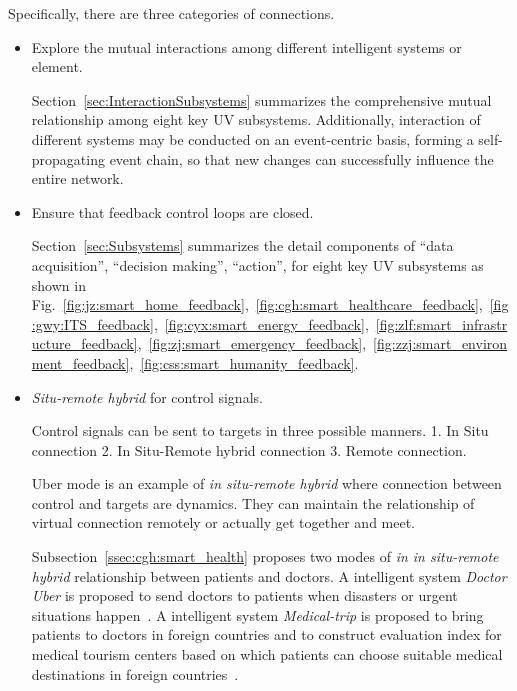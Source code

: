 \documentclass[letterpaper, twocolumn, 10pt, conference]{IEEEtran}
\begin{document}
Specifically, there are three categories of connections. 
\begin{itemize}
	
	\item   Explore the mutual interactions among different intelligent systems or element. 
	
	Section~\ref{sec:InteractionSubsystems} summarizes the comprehensive mutual relationship among eight key UV subsystems. Additionally, interaction of different systems may be conducted on an event-centric basis, forming a self-propagating event chain, so that new changes can successfully influence the entire network.
	            
    \item    Ensure that feedback control loops are closed. 
	
	Section~\ref{sec:Subsystems} summarizes the detail components of  \enquote{data acquisition}, \enquote{decision making}, \enquote{action}, for eight key UV subsystems as shown in 
Fig.~\ref{fig:jz:smart_home_feedback},~\ref{fig:cgh:smart_healthcare_feedback},~\ref{fig:gwy:ITS_feedback},~\ref{fig:cyx:smart_energy_feedback},~\ref{fig:zlf:smart_infrastructure_feedback},~\ref{fig:zj:smart_emergency_feedback},~\ref{fig:zzj:smart_environment_feedback},~\ref{fig:css:smart_humanity_feedback}.
	
	\item    \textit{Situ-remote hybrid} for control signals. 
	
	Control signals can be sent to targets in three possible manners. 1. In Situ connection  2. In Situ-Remote hybrid  connection 3. Remote connection.
	
	Uber mode is an example of  \textit{in situ-remote hybrid} where connection between control and targets are dynamics. They can maintain the relationship of virtual connection remotely or actually get together and meet. 
	
	Subsection~\ref{ssec:cgh:smart_health} proposes two modes of \textit{in in situ-remote hybrid}  relationship between patients and doctors. A intelligent system \textit{Doctor Uber}  is proposed to send doctors to patients when disasters or urgent situations happen~\cite{uv2018-healthcare-ma.haoran}. A intelligent system  \textit{Medical-trip} is proposed to bring patients to doctors in foreign countries and to construct evaluation index for medical tourism centers based on which patients can choose suitable medical destinations in foreign countries~\cite{uv2018-healthcare-su.qikai}.

\end{itemize}
\end{document}
